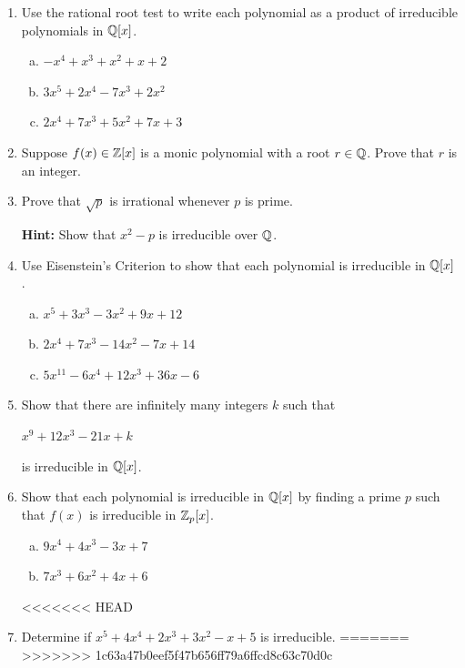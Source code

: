 \documentclass[11pt,fleqn,dvipsnames,usenames]{article}
\newcommand{\p}{\noindent}
\begin{document}
\p {\huge \S5.5 Problems}
\vsp
\begin{enumerate}[1.]
\item Use the rational root test to write each polynomial as a product of irreducible polynomials in $\mathbb{Q}[x]$.
\begin{enumerate}[(a)]
\item $-x^4 + x^3 + x^2 + x + 2$
\item $3x^5 + 2x^4 - 7x^3 + 2x^2$
\item $2x^4 + 7x^3 + 5x^2 + 7x + 3$
\end{enumerate}
\item Suppose $f(x)\in \mathbb{Z}[x]$ is a monic polynomial with a root $r\in \mathbb{Q}$.  Prove that $r$ is an integer.
\item Prove that $\sqrt{p}$ is irrational whenever $p$ is prime.

\textbf{Hint:} Show that $x^2 - p$ is irreducible over $\mathbb{Q}$.

\item Use Eisenstein's Criterion to show that each polynomial is irreducible in $\mathbb{Q}[x]$.
\begin{enumerate}[(a)]
\item $x^5 + 3x^3 - 3x^2 + 9x + 12$
\item $2x^4 + 7x^3 - 14x^2 - 7x + 14$
\item $5x^{11} - 6x^4 + 12x^3 + 36x - 6$
\end{enumerate}
\item Show that there are infinitely many integers $k$ such that
\begin{center}
$x^9 + 12x^3 - 21x + k$
\end{center}
is irreducible in $\mathbb{Q}[x]$.
\item Show that each polynomial is irreducible in $\mathbb{Q}[x]$ by finding a prime $p$ such that $f(x)$ is irreducible in $\mathbb{Z}_{p}[x]$.
\begin{enumerate}[(a)]
\item $9x^4 + 4x^3 - 3x + 7$
\item $7x^3 + 6x^2 + 4x + 6$
\end{enumerate}
<<<<<<< HEAD

\item Determine if $x^5 + 4x^4 + 2x^3 + 3x^2 - x + 5$ is irreducible.
=======
>>>>>>> 1c63a47b0eef5f47b656ff79a6ffcd8c63c70d0c
\end{enumerate}
\end{document}
